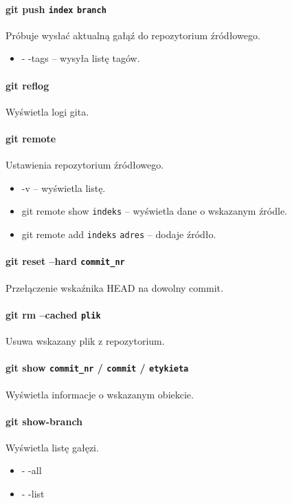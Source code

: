 \paragraph{git push \texttt{index} \texttt{branch}\\}
Próbuje wysłać aktualną gałąź do repozytorium źródłowego.
\begin{itemize}
	\item - -tags -- wysyła listę tagów.
\end{itemize}

\paragraph{git reflog\\}
Wyświetla logi gita.

\paragraph{git remote\\}
Ustawienia repozytorium źródłowego.
\begin{itemize}
	\item -v -- wyświetla listę.
	\item git remote show \texttt{indeks} -- wyświetla dane o wskazanym źródle.
	\item git remote add \texttt{indeks} \texttt{adres} -- dodaje źródło.
\end{itemize}

\paragraph{git reset --hard \texttt{commit\_nr}\\}
Przełączenie wskaźnika HEAD na dowolny commit.

\paragraph{git rm --cached \texttt{plik}\\}
Usuwa wskazany plik z repozytorium.

\paragraph{git show \texttt{commit\_nr} / \texttt{commit} / \texttt{etykieta}\\}
Wyświetla informacje o wskazanym obiekcie.

\paragraph{git show-branch\\}
Wyświetla listę gałęzi.
\begin{itemize}
	\item - -all
	\item - -list
\end{itemize}

